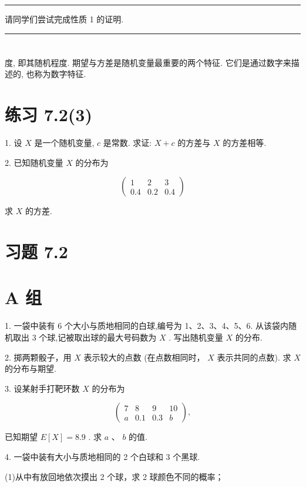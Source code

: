 \documentclass[10pt]{article}
\newcommand{\HRule}{\begin{center}\rule{0.9\linewidth}{0.2mm}\end{center}}
\begin{document}
\HRule

请同学们尝试完成性质 1 的证明.

\HRule

\section*{}

度, 即其随机程度. 期望与方差是随机变量最重要的两个特征. 它们是通过数字来描述的, 也称为数字特征.

\section*{练习 7.2(3)}

1. 设 \(X\) 是一个随机变量, \(c\) 是常数. 求证: \(X + c\) 的方差与 \(X\) 的方差相等.

2. 已知随机变量 \(X\) 的分布为

\[
\left( \begin{matrix} 1 & 2 & 3 \\  {0.4} & {0.2} & {0.4} \end{matrix}\right)
\]

求 \(X\) 的方差.

\section*{习题 7.2}

\section*{A 组}

1. 一袋中装有 6 个大小与质地相同的白球,编号为 1、2、3、4、5、6. 从该袋内随机取出 3 个球,记被取出球的最大号码数为 \(X\) . 写出随机变量 \(X\) 的分布.

2. 掷两颗骰子，用 \(X\) 表示较大的点数 (在点数相同时， \(X\) 表示共同的点数). 求 \(X\) 的分布与期望.

3. 设某射手打靶环数 \(X\) 的分布为

\[
\left( \begin{matrix} 7 & 8 & 9 & {10} \\  a & {0.1} & {0.3} & b \end{matrix}\right) ,
\]

已知期望 \(E\left\lbrack  X\right\rbrack   = {8.9}\) . 求 \(a\text{ 、 }b\) 的值.

4. 一袋中装有大小与质地相同的 2 个白球和 3 个黑球.

(1)从中有放回地依次摸出 2 个球，求 2 球颜色不同的概率；
\end{document}
